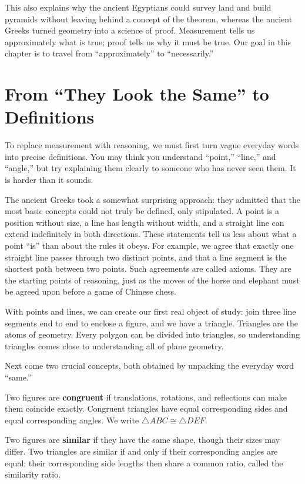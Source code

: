 This also explains why the ancient Egyptians could survey land and build pyramids without leaving behind a concept of the theorem, whereas the ancient Greeks turned geometry into a science of proof. Measurement tells us approximately what is true; proof tells us why it must be true. Our goal in this chapter is to travel from ``approximately'' to ``necessarily.''

\section{From ``They Look the Same'' to Definitions}

To replace measurement with reasoning, we must first turn vague everyday words into precise definitions. You may think you understand ``point,'' ``line,'' and ``angle,'' but try explaining them clearly to someone who has never seen them. It is harder than it sounds.

The ancient Greeks took a somewhat surprising approach: they admitted that the most basic concepts could not truly be defined, only stipulated. A point is a position without size, a line has length without width, and a straight line can extend indefinitely in both directions. These statements tell us less about what a point ``is'' than about the rules it obeys. For example, we agree that exactly one straight line passes through two distinct points, and that a line segment is the shortest path between two points. Such agreements are called axioms. They are the starting points of reasoning, just as the moves of the horse and elephant must be agreed upon before a game of Chinese chess.

With points and lines, we can create our first real object of study: join three line segments end to end to enclose a figure, and we have a triangle. Triangles are the atoms of geometry. Every polygon can be divided into triangles, so understanding triangles comes close to understanding all of plane geometry.

Next come two crucial concepts, both obtained by unpacking the everyday word ``same.''

\begin{dingyi}[Congruence]
Two figures are \textbf{congruent} if translations, rotations, and reflections can make them coincide exactly. Congruent triangles have equal corresponding sides and equal corresponding angles. We write $\triangle ABC \cong \triangle DEF$.
\end{dingyi}

\begin{dingyi}[Similarity]
Two figures are \textbf{similar} if they have the same shape, though their sizes may differ. Two triangles are similar if and only if their corresponding angles are equal; their corresponding side lengths then share a common ratio, called the similarity ratio.
\end{dingyi}

